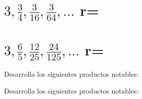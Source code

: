 \documentclass[12pt,addpoints,answers]{evalua}
\begin{document}
\begin{questions}
\begin{multicols}{2}
\begin{parts}
            \part {\large $3,\frac{3}{4}, \frac{3}{16}, \frac{3}{64},\dots$ \quad r=\fillin[$\frac{1}{4}$][0cm]}

            \begin{solutionbox}{2cm}

            \end{solutionbox}

            \part {\large $3,\frac{6}{5}, \frac{12}{25}, \frac{24}{125},\dots$ \quad r=\fillin[$\frac{2}{5}$][0cm]}

            \begin{solutionbox}{2cm}
            \end{solutionbox}
        \end{parts}

    \end{multicols}

    \question[] Desarrolla los siguientes productos notables:
    \begin{multicols}{2}
    \end{multicols}

    \question[] Desarrolla los siguientes productos notables:
    \begin{multicols}{2}
    \end{multicols}


\end{questions}
\end{document}
